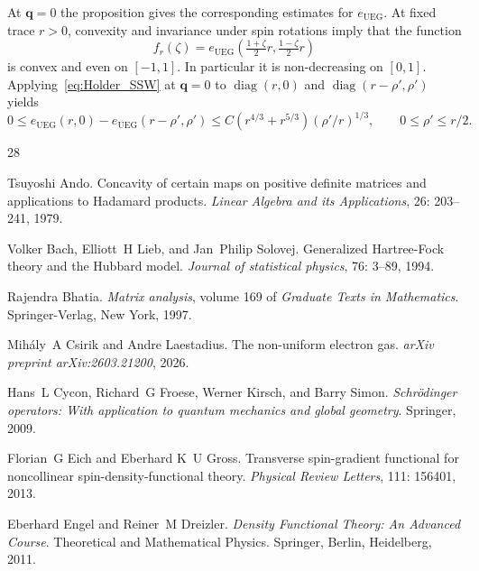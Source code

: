 \documentclass[final,reqno]{amsart}
\theoremstyle{remark}
\renewcommand{\le}{\leqslant}
\DeclareMathOperator{\diag}{diag}
\newcommand{\UEG}{\mathrm{UEG}}
\begin{document}
At $\mathbf{q}=0$ the proposition gives the corresponding estimates for $e_\UEG$. At fixed trace $r>0$, convexity and invariance under spin rotations imply that the function
\begin{equation*}
 f_r(\zeta)=e_\UEG\left(\tfrac{1+\zeta}{2}r,\tfrac{1-\zeta}{2}r\right)
\end{equation*}
is convex and even on $[-1,1]$. In particular it is non-decreasing on $[0,1]$. Applying~\cref{eq:Holder_SSW} at $\mathbf{q}=0$ to $\diag(r,0)$ and $\diag(r-\rho',\rho')$ yields
\begin{equation*}
 0\le e_\UEG(r,0)-e_\UEG(r-\rho',\rho')
 \le C(r^{4/3}+r^{5/3})(\rho'/r)^{1/3},\qquad 0\le\rho'\le r/2 .
\end{equation*}

\begin{thebibliography}{28}

Tsuyoshi Ando.
\newblock Concavity of certain maps on positive definite matrices and
  applications to {H}adamard products.
\newblock \emph{Linear Algebra and its Applications}, 26: 203--241,
  1979.

Volker Bach, Elliott~H Lieb, and Jan~Philip Solovej.
\newblock Generalized {H}artree-{F}ock theory and the {H}ubbard model.
\newblock \emph{Journal of statistical physics}, 76: 3--89, 1994.

Rajendra Bhatia.
\newblock \emph{Matrix analysis}, volume 169 of \emph{Graduate Texts in
  Mathematics}.
\newblock Springer-Verlag, New York, 1997.

Mih{\'a}ly~A Csirik and Andre Laestadius.
\newblock The non-uniform electron gas.
\newblock \emph{arXiv preprint arXiv:2603.21200}, 2026.

Hans~L Cycon, Richard~G Froese, Werner Kirsch, and Barry Simon.
\newblock \emph{Schr{\"o}dinger operators: With application to quantum
  mechanics and global geometry}.
\newblock Springer, 2009.

Florian~G Eich and Eberhard K~U Gross.
\newblock Transverse spin-gradient functional for noncollinear
  spin-density-functional theory.
\newblock \emph{Physical Review Letters}, 111: 156401, 2013.

Eberhard Engel and Reiner~M Dreizler.
\newblock \emph{Density Functional Theory: An Advanced Course}.
\newblock Theoretical and Mathematical Physics. Springer, Berlin, Heidelberg,
  2011.


\end{thebibliography}
\end{document}
